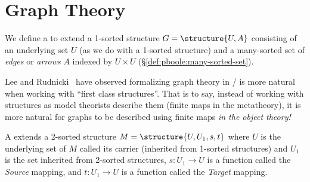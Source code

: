 
\chapter{Graph Theory}

\begin{definition}\label{def:graphs:graph-structure}
We define a  to extend a 1-sorted structure
$G=\structure{U,A}$ consisting of an underlying set $U$ (as we do with
a 1-sorted structure) and a many-sorted set of \emph{edges} or
\emph{arrows} $A$ indexed by $U\times U$
(\S\ref{def:pboole:many-sorted-set}).
\end{definition}

\begin{remark}
Lee and Rudnicki~\cite{lee2007alternative} have observed formalizing
graph theory in \Mizar/ is more natural when working with ``first
class structures''. That is to say, instead of working with structures
as model theorists describe them (finite maps in the metatheory), it
is more natural for graphs to be described using finite maps
\emph{in the object theory!}
\end{remark}

\begin{definition}
A  extends a 2-sorted structure
$M=\structure{U,U_{1},s,t}$ where $U$ is the underlying set of $M$
called its carrier (inherited from 1-sorted structures) and $U_{1}$ is
the set inherited from 2-sorted structures, $s\colon U_{1}\to U$ is a
function called the \emph{Source} mapping, and $t\colon U_{1}\to U$
is a function called the \emph{Target} mapping.
\end{definition}